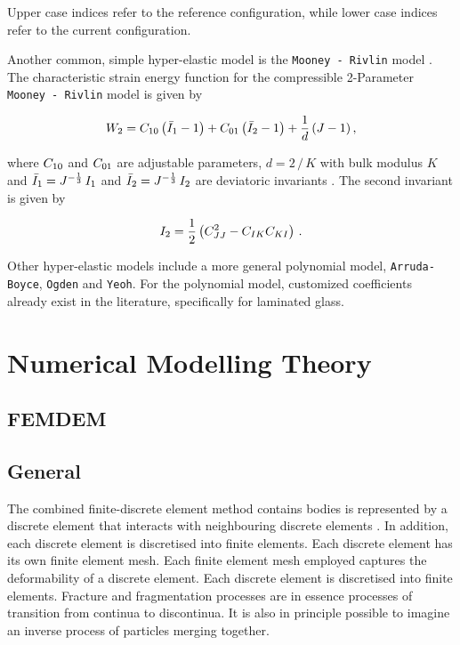\documentclass[format=acmtog,12pt,screen=true,review=false,natbib=false,]{acmart}
\begin{document}
Upper case indices refer to the reference configuration, while lower case indices refer to the current configuration.

\bigbreak
Another common, simple hyper-elastic model is the \texttt{Mooney - Rivlin} model \cite{Aba13, Kum16}. The characteristic strain energy function for the compressible 2-Parameter \texttt{Mooney - Rivlin} model \cite{Kum16} is given by

\begin{equation}
    \label{eq:MooneyRivlinSEF}
    W_{\rm{2}} = C_{\rm{10}}\left(\bar{I}_{\rm{1}}-1\right)+C_{\rm{01}}\left(\bar{I}_{\rm{2}}-1\right)+\frac{1}{d}\,(J-1)\,,
\end{equation}

where $C_{\rm{10}}$ and $C_{\rm{01}}$ are adjustable parameters, $d=2\,/\,K$ with bulk modulus $K$ and $\bar{I}_{\rm{1}}=J^{-\frac{1}{3}}\,I_{\rm{1}}$ and $\bar{I}_{\rm{2}}=J^{-\frac{1}{3}}\,I_{\rm{2}}$ are deviatoric invariants \cite{Aba13}. The second invariant is given by

\begin{equation}
    I_{\rm{2}}=\frac{1}{2}\left(C^2_{JJ}-C_{IK}C_{KI}\right)\,.
\end{equation}

\bigbreak
Other hyper-elastic models \cite{Aba13} include a more general polynomial model, \texttt{Arruda-Boyce}, \texttt{Ogden} and \texttt{Yeoh}. For the polynomial model, customized coefficients \cite{Sam19} already exist in the literature, specifically for laminated glass.

\section{Numerical Modelling Theory}
\label{sec:NumericsTheory}

\subsection{FEMDEM}

\subsection{General}
The combined finite-discrete element method  contains bodies is represented
by a discrete element that interacts with neighbouring discrete elements . In addition, each discrete element is discretised into finite elements. Each discrete element has its own finite element mesh. Each finite element mesh employed captures the deformability of a discrete element. Each discrete element is discretised into finite elements. Fracture and fragmentation processes are in essence processes of transition from continua to discontinua. It is also in principle possible to imagine an inverse process of particles merging together.\cite{Mun04}
\end{document}
